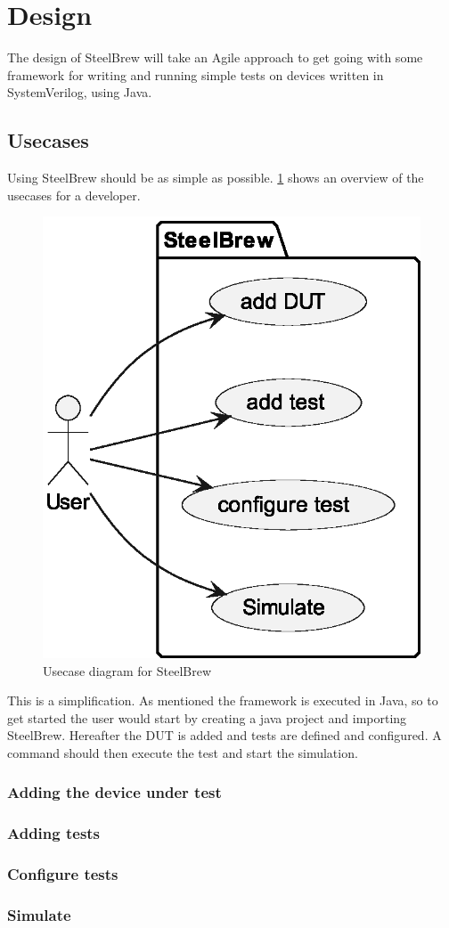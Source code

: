 \section{Design}\label{sec:04}
The design of SteelBrew will take an Agile approach to get going with some framework for writing and running simple tests on devices written in SystemVerilog, using Java.
\subsection{Usecases}
Using SteelBrew should be as simple as possible. \cref{fig:usecases} shows an overview of the usecases for a developer.
\begin{figure}
    \centering
    \caption{Usecase diagram for SteelBrew}\label{fig:usecases}
    \includegraphics[width=.3\textwidth]{out/plantuml/usecase/usecase.eps}
\end{figure}
This is a simplification. As mentioned the framework is executed in Java, so to get started the user would start by creating a java project and importing SteelBrew. Hereafter the DUT is added and tests are defined and configured. A command should then execute the test and start the simulation.
\subsubsection{Adding the device under test}
\subsubsection{Adding tests}
\subsubsection{Configure tests}
\subsubsection{Simulate}